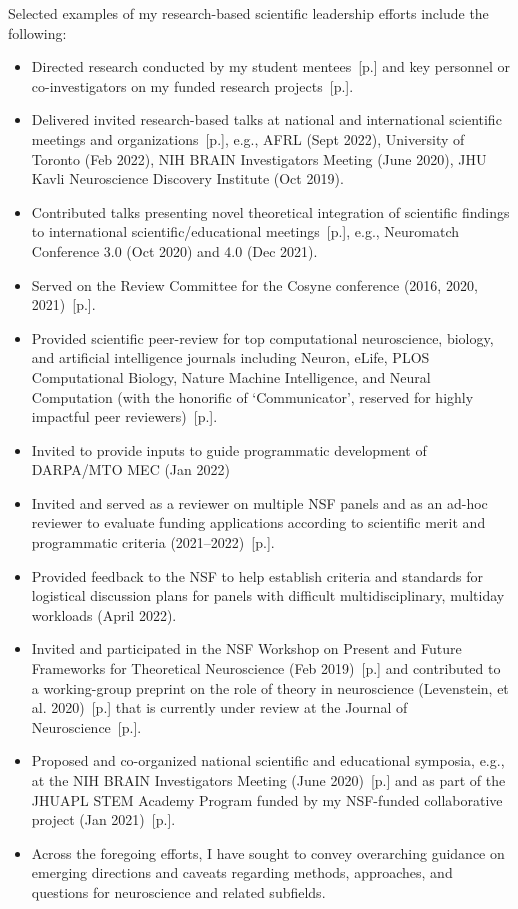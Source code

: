\documentclass[10pt]{article}
\newcommand{\see}[1]{[\textcolor{hopkinsblue}{p.\pageref{sec:#1}}]}
\begin{document}
Selected examples of my research-based scientific leadership efforts include the
following:
%
\begin{itemize}
  \item Directed research conducted by my student mentees~\see{mentoring}
    and key personnel or co-investigators on my funded research
    projects~\see{resprogram}.
  \item Delivered invited research-based talks at national and international
    scientific meetings and organizations~\see{natltalks}, e.g., AFRL (Sept 2022),
    University of Toronto (Feb 2022), NIH BRAIN Investigators Meeting (June 2020),
    JHU Kavli Neuroscience Discovery Institute (Oct 2019).
  \item Contributed talks presenting novel theoretical integration of scientific
    findings to international scientific/educational meetings~\see{intltalks}, e.g.,
    Neuromatch Conference 3.0 (Oct 2020) and 4.0 (Dec 2021).
  \item Served on the Review Committee for the Cosyne conference (2016, 2020,
    2021)~\see{confsvc}.
  \item Provided scientific peer-review for top computational neuroscience,
    biology, and artificial intelligence journals including Neuron, eLife, PLOS
    Computational Biology, Nature Machine Intelligence, and Neural Computation
    (with the honorific of `Communicator', reserved for highly impactful peer
    reviewers)~\see{service}.
  \item Invited to provide inputs to guide programmatic development of DARPA/MTO
    MEC (Jan 2022)
  \item Invited and served as a reviewer on multiple NSF panels and as an ad-hoc
    reviewer to evaluate funding applications according to scientific merit and
    programmatic criteria (2021--2022)~\see{programsvc}.
  \item Provided feedback to the NSF to help establish criteria and standards
    for logistical discussion plans for panels with difficult multidisciplinary,
    multiday workloads (April 2022).
  \item Invited and participated in the NSF Workshop on Present and Future
    Frameworks for Theoretical Neuroscience (Feb 2019)~\see{natltalks} and
    contributed to a working-group preprint on the role of theory in neuroscience
    (Levenstein, et al. 2020)~\see{preprints} that is currently under review at
    the Journal of Neuroscience~\see{pubs}.
  \item Proposed and co-organized national scientific and educational symposia,
    e.g., at the NIH BRAIN Investigators Meeting (June 2020)~\see{natltalks}
    and as part of the JHUAPL STEM Academy Program funded by my NSF-funded
    collaborative project (Jan 2021)~\see{eduprogram}.
  \item Across the foregoing efforts, I have sought to convey overarching
    guidance on emerging directions and caveats regarding methods, approaches, and
    questions for neuroscience and related subfields.
\end{itemize}
\end{document}
